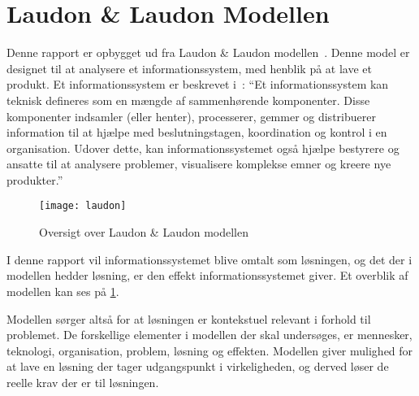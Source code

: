 \section{Laudon \& Laudon Modellen}
Denne rapport er opbygget ud fra Laudon \& Laudon modellen~\cite{laudon}. Denne model er designet til at analysere et informationssystem, med henblik på at lave et produkt. Et informationssystem er beskrevet i~\cite{laudon2006management}: \enquote{Et informationssystem kan teknisk defineres som en mængde af sammenhørende komponenter. Disse komponenter indsamler (eller henter), processerer, gemmer og distribuerer information til at hjælpe med beslutningstagen, koordination og kontrol i en organisation. Udover dette, kan informationssystemet også hjælpe bestyrere og ansatte til at analysere problemer, visualisere komplekse emner og kreere nye produkter.}

\begin{figure}
  \centering
  \texttt{[image: laudon]}
	\caption{Oversigt over Laudon \& Laudon modellen}
	\label{fig:oversigt_laudon}
\end{figure}

I denne rapport vil informationssystemet blive omtalt som løsningen, og det der i modellen hedder løsning, er den effekt informationssystemet giver. Et overblik af modellen kan ses på \cref{fig:oversigt_laudon}. 

Modellen sørger altså for at løsningen er kontekstuel relevant i forhold til problemet. De forskellige elementer i modellen der skal undersøges, er mennesker, teknologi, organisation, problem, løsning og effekten. Modellen giver mulighed for at lave en løsning der tager udgangspunkt i virkeligheden, og derved løser de reelle krav der er til løsningen.
